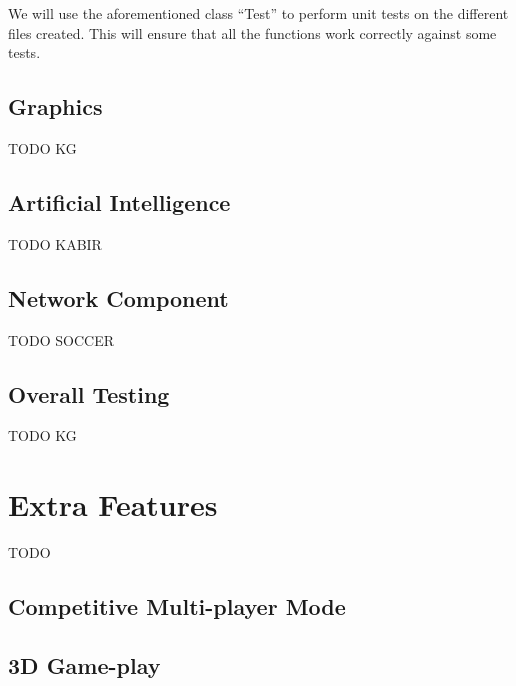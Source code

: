 \documentclass{article}
\begin{document}
				We will use the aforementioned class ``Test'' to perform unit tests on the different files created. This will ensure that all the functions work correctly against some tests.

			\subsection{Graphics}
				TODO KG
			\subsection{Artificial Intelligence}
				TODO KABIR
			\subsection{Network Component}
				TODO SOCCER
			\subsection{Overall Testing}
				TODO KG

	\section{Extra Features}
		TODO
		\subsection{Competitive Multi-player Mode}
		\subsection{3D Game-play}
\end{document}
